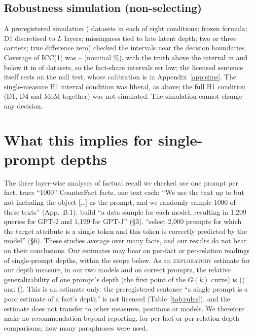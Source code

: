 \documentclass[11pt]{article}
\newcommand{\ICCone}{ICC(1)\xspace} %
\newcommand{\expl}{\textsc{exploratory}\xspace}
\newcommand{\olmo}{\OlmoTwoSevenB}
\newcommand{\llama}{\LlamaThreeOneEightB}
\begin{document}
\subsection{Robustness simulation (non-selecting)}
\label{sec:robust}
A preregistered simulation (\ptRobNSim{} datasets in each of eight conditions; frozen formula; D1 discretised to $L$ layers; missingness tied to late latent depth; two or three carriers; true difference zero) checked the intervals near the decision boundaries.
Coverage of \ICCone{} was \ptRobCovIccMin--\ptRobCovIccMax{} (nominal \ptCiLevel\%), with the truth above the interval in \ptRobIccMissAbove{} and below it in \ptRobIccMissBelow{} of \ptRobNTotal{} datasets, so the fact-share intervals err low; the licensed sentence itself rests on the null test, whose calibration is in Appendix~\ref{app:sims}.
The single-measure H1 interval condition was liberal, as above; the full H1 condition (D1, D4 and MoM together) was not simulated.
The simulation cannot change any decision.

\section{What this implies for single-prompt depths}
\label{sec:practice}
The three layer-wise analyses of factual recall we checked use one prompt per fact.
\citet{meng2022rome} trace ``1000'' CounterFact facts, one text each: ``We use the text up to but not including the object [\dots] as the prompt, and we randomly sample 1000 of these texts'' (App.~B.1). %
\citet{geva2023dissecting} build ``a data sample for each model, resulting in 1,209 queries for GPT-2 and 1,199 for GPT-J'' (\S3). %
\citet{hochman2026factual} ``select 2,000 prompts for which the target attribute is a single token and this token is correctly predicted by the model'' (\S6). %
These studies average over many facts, and our results do not bear on their conclusions.
Our estimates may bear on per-fact or per-relation readings of single-prompt depths, within the scope below.
As an \expl estimate for our depth measure, in our two models and on correct prompts, the relative generalizability of one prompt's depth (the first point of the $G(k)$ curve) is \explGOneLlama{} (\llama) and \explGOneOlmo{} (\olmo).
This is an estimate only: the preregistered sentence ``a single prompt is a poor estimate of a fact's depth'' is not licensed (Table~\ref{tab:rules}), and the estimate does not transfer to other measures, positions or models.
We therefore make no recommendation beyond reporting, for per-fact or per-relation depth comparisons, how many paraphrases were used.
\end{document}
